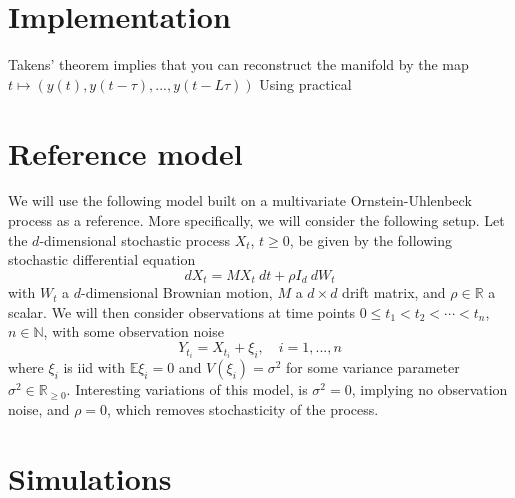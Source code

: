 \documentclass[11pt, a4paper]{memoir}
\begin{document}
\section{Implementation}
Takens' theorem implies that you can reconstruct the manifold by the map
$t\mapsto (y(t),y(t-\tau),...,y(t-L\tau))$
Using practical  
\section{Reference model}
We will use the following model built on a multivariate Ornstein-Uhlenbeck process as a reference. More specifically, we will consider the following setup. Let the $d$-dimensional stochastic process $X_t$, $t\geq 0$, be given by the following stochastic differential equation
$$dX_t=M X_t\ dt+\rho I_d\ dW_t$$
with $W_t$ a $d$-dimensional  Brownian motion, $M$ a $d\times d$ drift matrix, and $\rho\in \mathbb{R}$ a scalar. We will then consider observations at time points $0\leq t_1<t_2<\cdots <t_n$, $n\in \mathbb{N}$, with some observation noise
$$Y_{t_i}=X_{t_i}+\xi_i,\quad i=1,...,n$$
where $\xi_i$ is iid with $\mathbb{E} \xi_i=0$ and $V(\xi_i)=\sigma^2$ for some variance parameter $\sigma^2\in \mathbb{R}_{\geq 0}$. Interesting variations of this model, is $\sigma^2=0$, implying no observation noise, and $\rho=0$, which removes stochasticity of the process.


\section{Simulations}
 
 
\normalem


\end{document}
